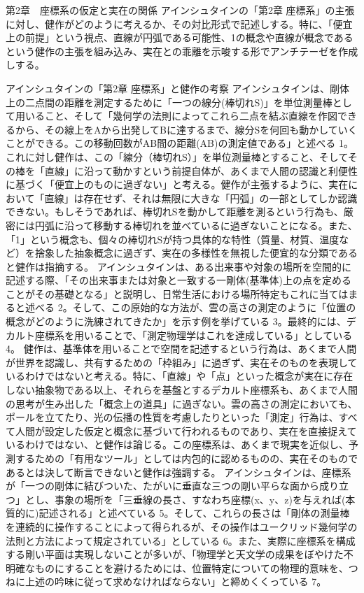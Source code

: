\documentclass{article}
\begin{document}
第2章　座標系の仮定と実在の関係
アインシュタインの「第2章 座標系」の主張に対し、健作がどのように考えるか、その対比形式で記述しする。特に、「便宜上の前提」という視点、直線が円弧である可能性、1の概念や直線が概念であるという健作の主張を組み込み、実在との乖離を示唆する形でアンチテーゼを作成しする。

アインシュタインの「第2章 座標系」と健作の考察
アインシュタインは、剛体上の二点間の距離を測定するために「一つの線分(棒切れS)」を単位測量棒として用いること、そして「幾何学の法則によってこれら二点を結ぶ直線を作図できるから、その線上をAから出発してBに達するまで、線分Sを何回も動かしていくことができる。この移動回数がAB間の距離(AB)の測定値である」と述べる 1。
これに対し健作は、この「線分（棒切れS）」を単位測量棒とすること、そしてその棒を「直線」に沿って動かすという前提自体が、あくまで人間の認識と利便性に基づく「便宜上のものに過ぎない」と考える。健作が主張するように、実在において「直線」は存在せず、それは無限に大きな「円弧」の一部としてしか認識できない。もしそうであれば、棒切れSを動かして距離を測るという行為も、厳密には円弧に沿って移動する棒切れを並べているに過ぎないことになる。また、「1」という概念も、個々の棒切れSが持つ具体的な特性（質量、材質、温度など）を捨象した抽象概念に過ぎず、実在の多様性を無視した便宜的な分類であると健作は指摘する。
アインシュタインは、ある出来事や対象の場所を空間的に記述する際、「その出来事または対象と一致する一剛体(基準体)上の点を定めることがその基礎となる」と説明し、日常生活における場所特定もこれに当てはまると述べる 2。そして、この原始的な方法が、雲の高さの測定のように「位置の概念がどのように洗練されてきたか」を示す例を挙げている 3。最終的には、デカルト座標系を用いることで、「測定物理学はこれを達成している」としている 4。
健作は、基準体を用いることで空間を記述するという行為は、あくまで人間が世界を認識し、共有するための「枠組み」に過ぎず、実在そのものを表現しているわけではないと考える。特に、「直線」や「点」といった概念が実在に存在しない抽象物である以上、それらを基盤とするデカルト座標系も、あくまで人間の思考が生み出した「概念上の道具」に過ぎない。雲の高さの測定においても、ポールを立てたり、光の伝播の性質を考慮したりといった「測定」行為は、すべて人間が設定した仮定と概念に基づいて行われるものであり、実在を直接捉えているわけではない、と健作は論じる。この座標系は、あくまで現実を近似し、予測するための「有用なツール」としては内包的に認めるものの、実在そのものであるとは決して断言できないと健作は強調する。
アインシュタインは、座標系が「一つの剛体に結びついた、たがいに垂直な三つの剛い平らな面から成り立つ」とし、事象の場所を「三垂線の長さ、すなわち座標(x、y、z)を与えれば(本質的に)記述される」と述べている 5。そして、これらの長さは「剛体の測量棒を連続的に操作することによって得られるが、その操作はユークリッド幾何学の法則と方法によって規定されている」としている 6。また、実際に座標系を構成する剛い平面は実現しないことが多いが、「物理学と天文学の成果をぼやけた不明確なものにすることを避けるためには、位置特定についての物理的意味を、つねに上述の吟味に従って求めなければならない」と締めくくっている 7。
\end{document}
